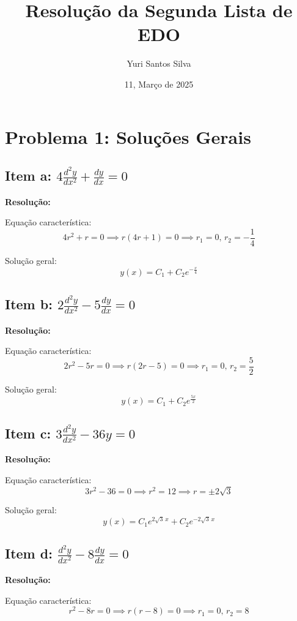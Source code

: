 \documentclass[12pt,a4paper]{article}
\title{Resolução da Segunda Lista de EDO}
\author{Yuri Santos Silva}
\date{11, Março de 2025}
\begin{document}
\maketitle

\section*{Problema 1: Soluções Gerais}

\subsection*{Item a: \(4 \frac{d^2 y}{dx^2} + \frac{dy}{dx} = 0\)}

\textbf{Resolução:}

Equação característica:
\[
4r^2 + r = 0 \implies r(4r + 1) = 0 \implies r_1 = 0, \, r_2 = -\frac{1}{4}
\]

Solução geral:
\[
\boxed{y(x) = C_1 + C_2 e^{-\frac{x}{4}}}
\]

\subsection*{Item b: \(2 \frac{d^2 y}{dx^2} - 5 \frac{dy}{dx} = 0\)}

\textbf{Resolução:}

Equação característica:
\[
2r^2 - 5r = 0 \implies r(2r - 5) = 0 \implies r_1 = 0, \, r_2 = \frac{5}{2}
\]

Solução geral:
\[
\boxed{y(x) = C_1 + C_2 e^{\frac{5x}{2}}}
\]

\subsection*{Item c: \(3 \frac{d^2 y}{dx^2} - 36y = 0\)}

\textbf{Resolução:}

Equação característica:
\[
3r^2 - 36 = 0 \implies r^2 = 12 \implies r = \pm 2\sqrt{3}
\]

Solução geral:
\[
\boxed{y(x) = C_1 e^{2\sqrt{3}\,x} + C_2 e^{-2\sqrt{3}\,x}}
\]

\subsection*{Item d: \(\frac{d^2 y}{dx^2} - 8 \frac{dy}{dx} = 0\)}

\textbf{Resolução:}

Equação característica:
\[
r^2 - 8r = 0 \implies r(r - 8) = 0 \implies r_1 = 0, \, r_2 = 8
\]
\end{document}
